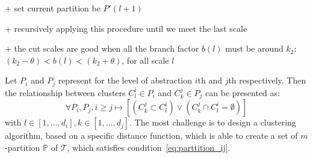 + set current partition be $P'(l+1)$

+ recursively applying this procedure until we meet the last scale

+ the cut scales are good when all the branch factor $b(l)$ must be around $k_2$: $(k_2 - \theta) < b(l)< (k_2 + \theta)$, for all scale $l$

Let $P_i$ and $P_j$ represent for the level of abstraction $i$th and $j$th respectively. Then the relationship between clusters $C_{l}^{i} \in P_i$ and $C_{k}^{j} \in P_j$ can be presented as: 
\begin{equation}
\label{eq:parttition_ij}
	\forall  P_i, P_j, i \geq j \mapsto [(C_{k}^{j} \subset C_{l}^{i}) \vee (C_{k}^{j} \cap  C_{l}^{i} = \emptyset)]    
\end{equation}
with $l \in [1, \ldots, d_i],k \in [1, \ldots, d_j]$. The most challenge is to design a clustering algorithm, based on a specific distance function, which is able to create a set of $m$-partition $\mathbb{P}$ of $\mathcal{T}$, which satisfies condition~\ref{eq:parttition_ij}. 
